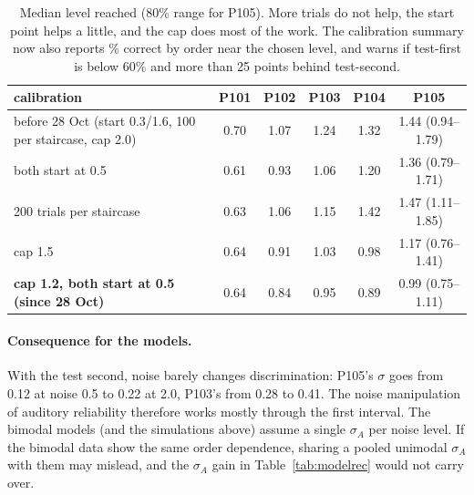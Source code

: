 \documentclass[11pt,a4paper]{article}
\begin{document}
\begin{table}[H]
\centering\small
\begin{tabular}{lccccc}
\toprule
calibration & P101 & P102 & P103 & P104 & P105 \\
\midrule
before 28 Oct (start 0.3/1.6, 100 per staircase, cap 2.0) & 0.70 & 1.07 & 1.24 & 1.32 & 1.44 (0.94--1.79) \\
both start at 0.5 & 0.61 & 0.93 & 1.06 & 1.20 & 1.36 (0.79--1.71) \\
200 trials per staircase & 0.63 & 1.06 & 1.15 & 1.42 & 1.47 (1.11--1.85) \\
cap 1.5 & 0.64 & 0.91 & 1.03 & 0.98 & 1.17 (0.76--1.41) \\
\textbf{cap 1.2, both start at 0.5 (since 28 Oct)} & 0.64 & 0.84 & 0.95 & 0.89 & 0.99 (0.75--1.11) \\
\bottomrule
\end{tabular}
\caption{Median level reached (80\% range for P105). More trials do not help, the start point helps a little, and the cap does most of the work. The calibration summary now also reports \% correct by order near the chosen level, and warns if test-first is below 60\% and more than 25 points behind test-second.}
\end{table}

\paragraph{Consequence for the models.} With the test second, noise barely changes discrimination: P105's $\sigma$ goes from 0.12 at noise 0.5 to 0.22 at 2.0, P103's from 0.28 to 0.41. The noise manipulation of auditory reliability therefore works mostly through the first interval. The bimodal models (and the simulations above) assume a single $\sigma_A$ per noise level. If the bimodal data show the same order dependence, sharing a pooled unimodal $\sigma_A$ with them may mislead, and the $\sigma_A$ gain in Table~\ref{tab:modelrec} would not carry over.
\end{document}
